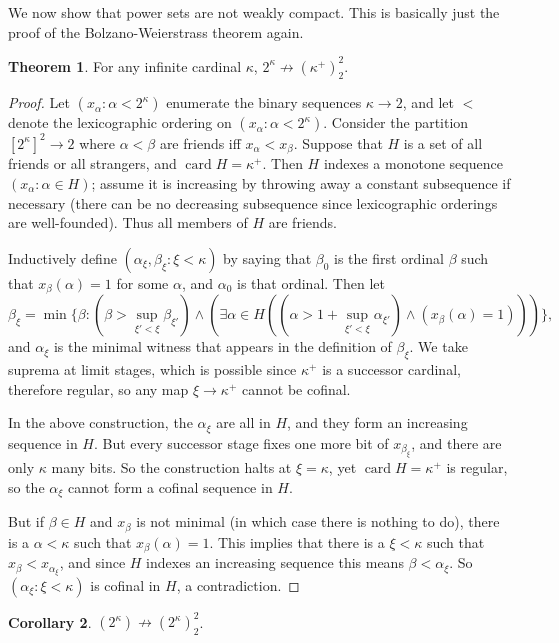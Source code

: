 \documentclass[12pt]{report}
\newcommand{\card}{\operatorname{card}}
\theoremstyle{definition}
\newtheorem{theorem}{Theorem}[chapter]
\newtheorem{corollary}[theorem]{Corollary}
\begin{document}
We now show that power sets are not weakly compact. This is basically just the proof of the Bolzano-Weierstrass theorem again.
\begin{theorem}
For any infinite cardinal $\kappa$, $2^\kappa \not\to (\kappa^+)_2^2$.
\end{theorem}
\begin{proof}
Let $(x_\alpha: \alpha < 2^\kappa)$ enumerate the binary sequences $\kappa \to 2$, and let $<$ denote the lexicographic ordering on $(x_\alpha: \alpha < 2^\kappa)$.
Consider the partition $[2^\kappa]^2 \to 2$ where $\alpha<\beta$ are friends iff $x_\alpha < x_\beta$.
Suppose that $H$ is a set of all friends or all strangers, and $\card H = \kappa^+$.
Then $H$ indexes a monotone sequence $(x_\alpha: \alpha \in H)$; assume it is increasing by throwing away a constant subsequence if necessary (there can be no decreasing subsequence since lexicographic orderings are well-founded).
Thus all members of $H$ are friends.

Inductively define $(\alpha_\xi, \beta_\xi: \xi < \kappa)$ by
saying that $\beta_0$ is the first ordinal $\beta$ such that $x_\beta(\alpha) = 1$ for some $\alpha$, and $\alpha_0$ is that ordinal. Then let
$$\beta_\xi = \min\{\beta: (\beta > \sup_{\xi'<\xi}\beta_{\xi'}) \wedge (\exists \alpha \in H((\alpha > 1 + \sup_{\xi'<\xi} \alpha_{\xi'}) \wedge (x_\beta(\alpha) = 1)))\},$$
and $\alpha_\xi$ is the minimal witness that appears in the definition of $\beta_\xi$.
We take suprema at limit stages, which is possible since $\kappa^+$ is a successor cardinal, therefore regular, so any map $\xi \to \kappa^+$ cannot be cofinal.

In the above construction, the $\alpha_\xi$ are all in $H$, and they form an increasing sequence in $H$.
But every successor stage fixes one more bit of $x_{\beta_\xi}$, and there are only $\kappa$ many bits.
So the construction halts at $\xi = \kappa$, yet $\card H = \kappa^+$ is regular, so the $\alpha_\xi$ cannot form a cofinal sequence in $H$.

But if $\beta \in H$ and $x_\beta$ is not minimal (in which case there is nothing to do), there is a $\alpha < \kappa$ such that $x_\beta(\alpha) = 1$.
This implies that there is a $\xi < \kappa$ such that $x_\beta < x_{\alpha_\xi}$, and since $H$ indexes an increasing sequence this means $\beta < \alpha_\xi$.
So $(\alpha_\xi: \xi < \kappa)$ is cofinal in $H$, a contradiction.
\end{proof}

\begin{corollary}
$(2^\kappa) \not \to (2^\kappa)^2_2$.
\end{corollary}
\end{document}
